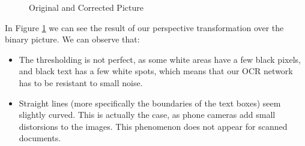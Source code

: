 \documentclass[11pt, a4paper]{report}
\begin{document}
\begin{figure}[!h]
	\hfill
	\hfill
	\caption{Original and Corrected Picture}
	\label{parser-corrected-image}
\end{figure}

In Figure \ref{parser-corrected-image} we can see the result of our perspective transformation over the binary picture. We can observe that:

\begin{itemize}
	\item The thresholding is not perfect, as some white areas have a few black pixels, and black text has a few white spots, which means that our OCR network has to be resistant to small noise.
	\item Straight lines (more specifically the boundaries of the text boxes) seem slightly curved. This is actually the case, as phone cameras add small distorsions to the images. This phenomenon does not appear for scanned documents.
\end{itemize}
\end{document}
